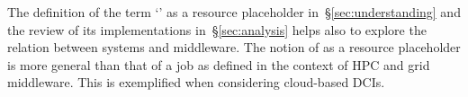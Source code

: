 \documentclass{sig-alternate}
\begin{document}







The definition of the term `\pilot' as a resource placeholder
in~\S\ref{sec:understanding} and the review of its implementations
in~\S\ref{sec:analysis} helps also to explore the relation between \pilot
systems and middleware. The notion of \pilot as a resource placeholder is more
general than that of a job as defined in the context of HPC and grid middleware.
This is exemplified when considering cloud-based DCIs.

\end{document}
